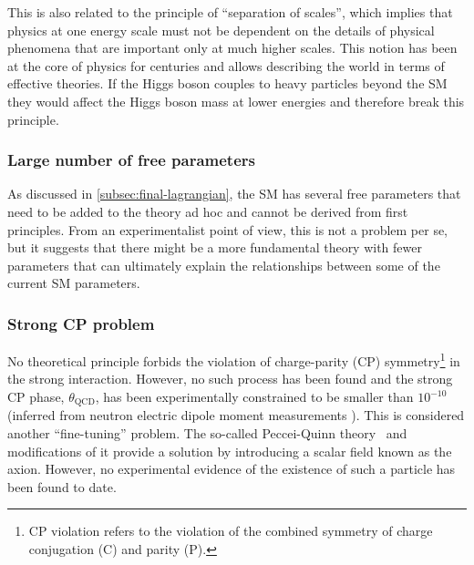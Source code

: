 This is also related to the principle of ``separation of scales'', which implies that physics at one energy scale must not be dependent on the details of physical phenomena that are important only at much higher scales.
This notion has been at the core of physics for centuries and allows describing the world in terms of effective theories. 
If the Higgs boson couples to heavy particles beyond the SM they would affect the Higgs boson mass at lower energies and therefore break this principle.

\subsubsection{Large number of free parameters}
As discussed in \cref{subsec:final-lagrangian}, the SM has several free parameters that need to be added to the theory ad hoc and cannot be derived from first principles. 
From an experimentalist point of view, this is not a problem per se, but it suggests that there might be a more fundamental theory with fewer parameters that can ultimately explain the relationships between some of the current SM parameters.


\subsubsection{Strong CP problem}
No theoretical principle forbids the violation of charge-parity (CP) symmetry\footnote{CP violation refers to the violation of the combined symmetry of charge conjugation (C) and parity (P).} in the strong interaction. However, no such process has been found and the strong CP phase, $\theta_{\text{QCD}}$, has been experimentally constrained to be smaller than $10^{-10}$ (inferred from neutron electric dipole moment measurements \cite{Baker_2006}). This is considered another ``fine-tuning'' problem.
The so-called Peccei-Quinn theory~\cite{PhysRevLett.38.1440} and modifications of it provide a solution by introducing a scalar field known as the axion. However, no experimental evidence of the existence of such a particle has been found to date.

